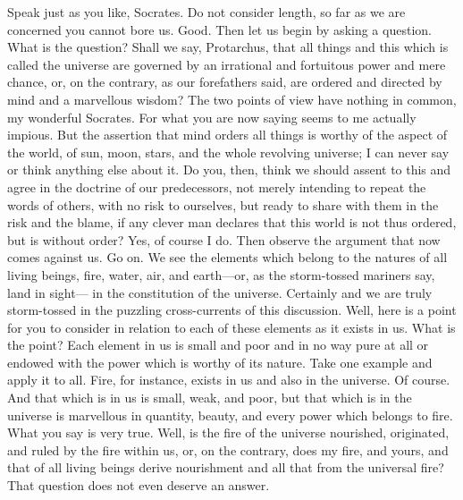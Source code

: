 \documentclass[letterpaper,12pt]{article}
\newcommand{\stephpag}[1]{\marginnote{\small\itshape\fontfamily{ppl}\selectfont #1}}
\begin{document}
\begin{drama}
\protarchusspeaks
Speak just as you like, Socrates. Do not consider length, so far as we are concerned you cannot bore us.
\socratesspeaks
Good. Then let us begin by asking a question.
\protarchusspeaks
What is the question?
\socratesspeaks
Shall we say, Protarchus, that all things and this which is called the universe are governed by an irrational and fortuitous power and mere chance, or, on the contrary, as our forefathers said, are ordered and directed by mind and a marvellous wisdom? \stephpag{e}
\protarchusspeaks
The two points of view have nothing in common, my wonderful Socrates. For what you are now saying seems to me actually impious. But the assertion that mind orders all things is worthy of the aspect of the world, of sun, moon, stars, and the whole revolving universe; I can never say or think anything else about it.
\socratesspeaks
Do you, then, think we should assent to this and agree in the doctrine of our predecessors, \stephpag{29 a} not merely intending to repeat the words of others, with no risk to ourselves, but ready to share with them in the risk and the blame, if any clever man declares that this world is not thus ordered, but is without order?
\protarchusspeaks
Yes, of course I do.
\socratesspeaks
Then observe the argument that now comes against us.
\protarchusspeaks
Go on.
\socratesspeaks
We see the elements which belong to the natures of all living beings, fire, water, air, and earth---or, as the storm-tossed mariners say, land in sight--- \stephpag{b} in the constitution of the universe.
\protarchusspeaks
Certainly and we are truly storm-tossed in the puzzling cross-currents of this discussion.
\socratesspeaks
Well, here is a point for you to consider in relation to each of these elements as it exists in us.
\protarchusspeaks
What is the point?
\socratesspeaks
Each element in us is small and poor and in no way pure at all or endowed with the power which is worthy of its nature. Take one example and apply it to all. Fire, for instance, exists in us and also in the universe.
\protarchusspeaks
Of course. \stephpag{c}
\socratesspeaks
And that which is in us is small, weak, and poor, but that which is in the universe is marvellous in quantity, beauty, and every power which belongs to fire.
\protarchusspeaks
What you say is very true.
\socratesspeaks
Well, is the fire of the universe nourished, originated, and ruled by the fire within us, or, on the contrary, does my fire, and yours, and that of all living beings derive nourishment and all that from the universal fire?
\protarchusspeaks
That question does not even deserve an answer. \stephpag{d}

\end{drama}
\end{document}
